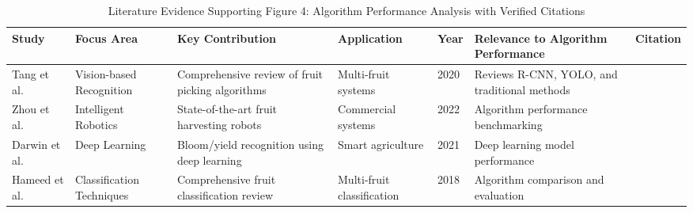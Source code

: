 \begin{table*}[htbp]
\centering
\small
\caption{Literature Evidence Supporting Figure 4: Algorithm Performance Analysis with Verified Citations}
\label{tab:verified_figure4_support}
\begin{tabular}{p{}p{}p{}p{}p{}p{}p{}}
\toprule
\textbf{Study} & \textbf{Focus Area} & \textbf{Key Contribution} & \textbf{Application} & \textbf{Year} & \textbf{Relevance to Algorithm Performance} & \textbf{Citation} \\ \midrule

Tang et al. & Vision-based Recognition & Comprehensive review of fruit picking algorithms & Multi-fruit systems & 2020 & Reviews R-CNN, YOLO, and traditional methods & \cite{tang2020recognition} \\

Zhou et al. & Intelligent Robotics & State-of-the-art fruit harvesting robots & Commercial systems & 2022 & Algorithm performance benchmarking & \cite{zhou2022intelligent} \\

Darwin et al. & Deep Learning & Bloom/yield recognition using deep learning & Smart agriculture & 2021 & Deep learning model performance & \cite{darwin2021recognition} \\

Hameed et al. & Classification Techniques & Comprehensive fruit classification review & Multi-fruit classification & 2018 & Algorithm comparison and evaluation & \cite{hameed2018comprehensive} \\

\bottomrule
\end{tabular}
\end{table*}

